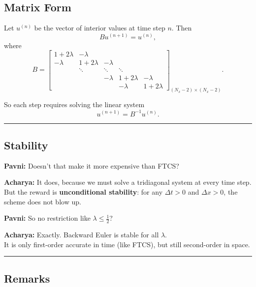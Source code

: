 \documentclass[
  letterpaper,
]{book}
\begin{document}
\subsection{Matrix Form}\label{matrix-form}

Let \(u^{(n)}\) be the vector of interior values at time step \(n\).
Then \[
B u^{(n+1)} = u^{(n)},
\] where \[
B =
\begin{bmatrix}
1+2\lambda & -\lambda     &            &            &   \\
-\lambda    & 1+2\lambda  & -\lambda   &            &   \\
            & \ddots      & \ddots     & \ddots     &   \\
            &             & -\lambda   & 1+2\lambda & -\lambda \\
            &             &            & -\lambda   & 1+2\lambda
\end{bmatrix}_{(N_x-2)\times(N_x-2)}.
\]

So each step requires solving the linear system \[
u^{(n+1)} = B^{-1} u^{(n)}.
\]

\begin{center}\rule{0.5\linewidth}{0.5pt}\end{center}

\subsection{Stability}\label{stability}

\textbf{Pavni:} Doesn't that make it more expensive than FTCS?

\textbf{Acharya:} It does, because we must solve a tridiagonal system at
every time step.\\
But the reward is \textbf{unconditional stability}: for any
\(\Delta t > 0\) and \(\Delta x > 0\), the scheme does not blow up.

\textbf{Pavni:} So no restriction like \(\lambda \leq \tfrac{1}{2}\)?

\textbf{Acharya:} Exactly. Backward Euler is stable for all
\(\lambda\).\\
It is only first-order accurate in time (like FTCS), but still
second-order in space.

\begin{center}\rule{0.5\linewidth}{0.5pt}\end{center}

\subsection{Remarks}\label{remarks-1}
\end{document}
